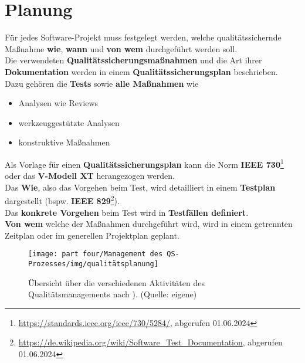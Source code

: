 \section{Planung}
Für jedes Software-Projekt muss festgelegt werden, welche qualitätssichernde Maßnahme \textbf{wie}, \textbf{wann} und \textbf{von wem} durchgeführt werden soll.\\

\noindent
Die verwendeten \textbf{Qualitätssicherungsmaßnahmen} und die Art ihrer \textbf{Dokumentation} werden in einem \textbf{Qualitätssicherungsplan} beschrieben.\\
Dazu gehören die \textbf{Tests} sowie \textbf{alle Maßnahmen} wie

\begin{itemize}
    \item Analysen wie Reviews
    \item werkzeuggestützte Analysen
    \item konstruktive Maßnahmen
\end{itemize}

\noindent
Als Vorlage für einen \textbf{Qualitätssicherungsplan} kann die  Norm \textbf{IEEE 730}\footnote{
\url{https://standards.ieee.org/ieee/730/5284/}, abgerufen 01.06.2024
} oder das \textbf{V-Modell XT} herangezogen werden.\\
Das \textbf{Wie}, also das Vorgehen beim Test, wird detailliert in einem \textbf{Testplan} dargestellt (bspw. \textbf{IEEE 829}\footnote{
\url{https://de.wikipedia.org/wiki/Software_Test_Documentation}, abgerufen 01.06.2024
}).\\
Das \textbf{konkrete Vorgehen} beim Test wird in \textbf{Testfällen definiert}.\\
\textbf{Von wem} welche der Maßnahmen durchgeführt wird, wird in einem getrennten Zeitplan oder im generellen Projektplan  geplant.


\begin{figure}
    \centering
    \texttt{[image: part four/Management des QS-Prozesses/img/qualitätsplanung]}
    \caption{Übersicht über die verschiedenen Aktivitäten des Qualitätsmanagements nach \cite[479 ff.]{Bal08}). (Quelle: eigene)}
    \label{fig:qualitätsplanung}
\end{figure}


